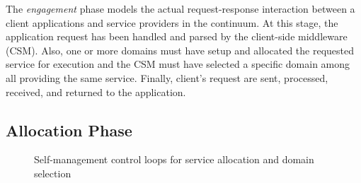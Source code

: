 The \textit{engagement} phase models the actual request-response interaction between a client applications and service providers in the continuum. At this stage, the application request has been handled and parsed by the client-side middleware (CSM). Also, one or more domains must have setup and allocated the requested service for execution and the CSM must have selected a specific domain among all providing the same service. Finally, client's request are sent, processed, received, and returned to the application.



\subsection*{Allocation Phase}\label{sec:A3-E-allocation}

\begin{figure}[thbp]
	\centering
	\captionsetup[subfigure]{width=0.4\textwidth}	
	\null\hfill
	\captionsetup[subfigure]{width=0.4\textwidth}	
	\hfill
	\hfill\null
	\caption{Self-management control loops for service allocation and domain selection}\label{fig:allocation-loops}
\end{figure}

